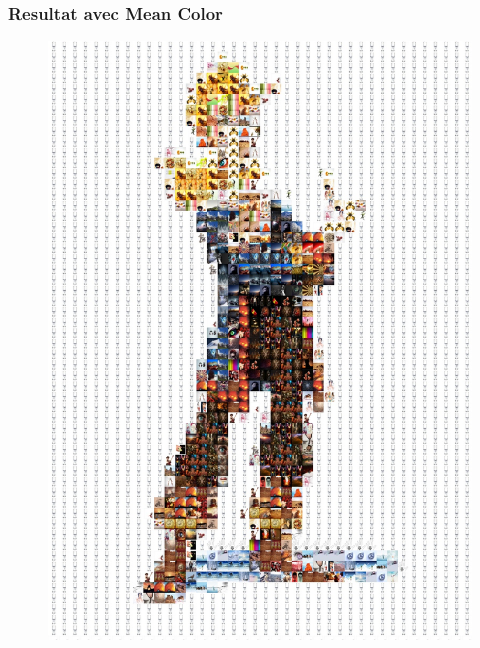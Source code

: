 \documentclass[handout]{beamer}
\begin{document}
\begin{frame}
\frametitle{\bf Resultat avec Mean Color}
\begin{figure}[H]
\includegraphics[scale=0.36]{guybrushmeancolor.jpg}
\end{figure}
\end{frame}
\end{document}
